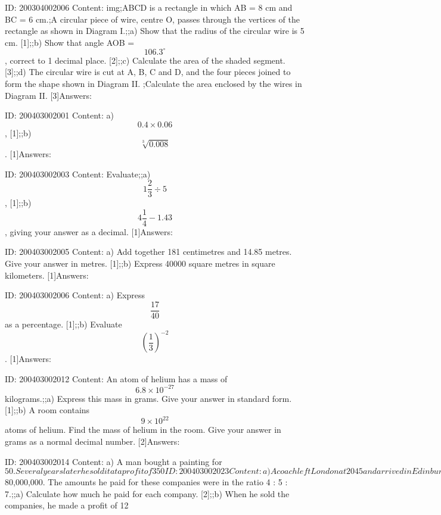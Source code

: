 \documentclass{article}
\begin{document}
ID: 200304002006
Content:
img;ABCD is a rectangle in which AB = 8 cm and BC = 6 cm.;A circular piece of wire, centre O, passes through the vertices of the rectangle as shown in Diagram I.;;a) Show that the radius of the circular wire is 5 cm.   [1];;b) Show that angle AOB = $$106.3^{\circ}$$, correct to 1 decimal place.   [2];;c) Calculate the area of the shaded segment.   [3];;d) The circular wire is cut at A, B, C and D, and the four pieces joined to form the shape shown in Diagram II. ;Calculate the area enclosed by the wires in Diagram II.   [3]Answers:

ID: 200403002001
Content:
a) $$0.4 \times 0.06$$, [1];;b) $$\sqrt[3]{0.008}$$. [1]Answers:

ID: 200403002003
Content:
Evaluate;;a) $$1\frac{2}{3}\div 5$$, [1];;b) $$4\frac{1}{4}-1.43$$, giving your answer as a decimal. [1]Answers:

ID: 200403002005
Content:
a) Add together 181 centimetres and 14.85 metres. Give your answer in metres. [1];;b) Express 40000 square metres in square kilometers. [1]Answers:

ID: 200403002006
Content:
a) Express $$\frac{17}{40}$$ as a percentage. [1];;b) Evaluate $$(\frac{1}{3})^{-2}$$. [1]Answers:

ID: 200403002012
Content:
An atom of helium has a mass of $$6.8 \times 10^{-27}$$ kilograms.;;a) Express this mass in grams. Give your answer in standard form. [1];;b) A room contains $$9 \times 10^{22}$$ atoms of helium. Find the mass of helium in the room. Give your answer in grams as a normal decimal number. [2]Answers:

ID: 200403002014
Content:
a) A man bought a painting for $50. Several years later he sold it at a profit of 350%

ID: 200403002023
Content:
a) A coach left London at 20 45 and arrived in Edinburgh the next day at 05 05. How long does the journey take? [1];;b) The distance between London and Edinburgh is 660 km.;;b-i) A train took 5 hours 30 minutes to complete the journey. Calculate its average speed. [2];;b-ii) The average speed of another train was 150 km/h. How long did this train take for the journey? Give your answer in hours and minutes. [2]Answers:

ID: 200404002003
Content:
Mr. Smith bought three companies, Alpha, Beta and Gamma, for a total of $80,000,000. The amounts he paid for these companies were in the ratio 4 : 5 : 7.;;a) Calculate how much he paid for each company. [2];;b) When he sold the companies, he made a profit of 12%
\end{document}
